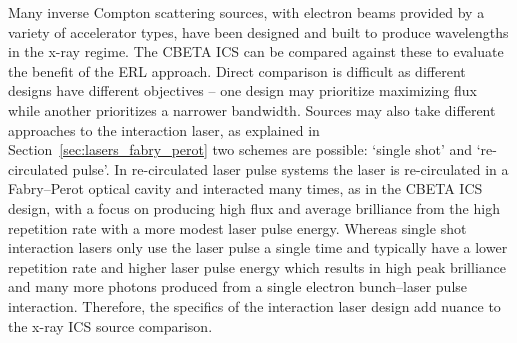 \documentclass[../main.tex]{subfiles}
\begin{document}
Many inverse Compton scattering sources, with electron beams provided by a variety of accelerator types, have been designed and built to produce wavelengths in the x-ray regime. The CBETA ICS can be compared against these to evaluate the benefit of the ERL approach. Direct comparison is difficult as different designs have different objectives -- one design may prioritize maximizing flux while another prioritizes a narrower bandwidth. Sources may also take different approaches to the interaction laser, as explained in Section~\ref{sec:lasers_fabry_perot} two schemes are possible: `single shot' and `re-circulated pulse'. In re-circulated laser pulse systems the laser is re-circulated in a Fabry--Perot optical cavity and interacted many times, as in the CBETA ICS design, with a focus on producing high flux and average brilliance from the high repetition rate with a more modest laser pulse energy. Whereas single shot interaction lasers only use the laser pulse a single time and typically have a lower repetition rate and higher laser pulse energy which results in high peak brilliance and many more photons produced from a single electron bunch--laser pulse interaction. Therefore, the specifics of the interaction laser design add nuance to the x-ray ICS source comparison.
\end{document}
